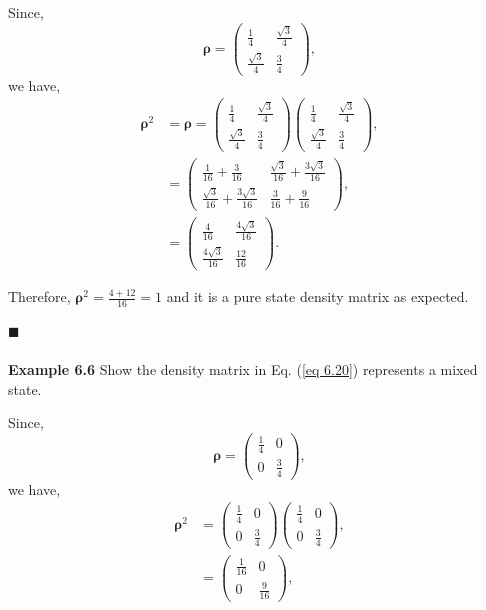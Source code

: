 \documentclass{article}
\begin{document}
Since, 
\begin{equation} \label{eq 6.29}
    \boldsymbol{\rho}=\begin{pmatrix}
        \frac{1}{4} & \frac{\sqrt{3}}{4}\\
        \frac{\sqrt{3}}{4}& \frac{3}{4}
    \end{pmatrix}, \tag{6.29}
\end{equation}
we have,
\begin{align*} \label{eq 6.30}
    \boldsymbol{\rho}^2&=\boldsymbol{\rho}=\begin{pmatrix}
        \frac{1}{4} & \frac{\sqrt{3}}{4}\\
        \frac{\sqrt{3}}{4}& \frac{3}{4}
    \end{pmatrix}
    \begin{pmatrix}
        \frac{1}{4} & \frac{\sqrt{3}}{4}\\
        \frac{\sqrt{3}}{4}& \frac{3}{4}
    \end{pmatrix},\\
    &= \begin{pmatrix}
        \frac{1}{16}+\frac{3}{16}& \frac{\sqrt{3}}{16}+\frac{3\sqrt{3}}{16}\\
        \frac{\sqrt{3}}{16}+ \frac{3\sqrt{3}}{16}& \frac{3}{16}+\frac{9}{16}
    \end{pmatrix},\\
    &=\begin{pmatrix}
        \frac{4}{16} & \frac{4\sqrt{3}}{16}\\
        \frac{4\sqrt{3}}{16} & \frac{12}{16}
    \end{pmatrix}.\tag{6.30}
\end{align*}

Therefore, $\boldsymbol{\rho}^2=\frac{4+12}{16}=1$ and it is a pure state density matrix as expected.

\hfill $\blacksquare$
\\\\
\textbf{Example 6.6} Show the density matrix in Eq. (\ref{eq 6.20}) represents a mixed state.

Since,
\begin{equation}\label{eq 6.31}
    \boldsymbol{\rho}=\begin{pmatrix}
        \frac{1}{4} & 0\\ 0& \frac{3}{4}
    \end{pmatrix},\tag{6.31}
\end{equation}
we have,
\begin{align*} \label{eq 6.32}
    \boldsymbol{\rho}^2&=\begin{pmatrix}
        \frac{1}{4} & 0\\ 0& \frac{3}{4}
    \end{pmatrix}
    \begin{pmatrix}
        \frac{1}{4} & 0\\ 0& \frac{3}{4}
    \end{pmatrix},\\
    &=\begin{pmatrix}
        \frac{1}{16} & 0\\ 0& \frac{9}{16}
    \end{pmatrix}, \tag{6.32}
\end{align*}
\end{document}
